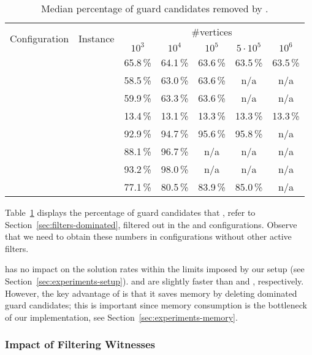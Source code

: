\begin{table}
	\centering
	\small
	\begin{tabular}{|l|l|ccccc|}
		\hline
		\multirow{2}{*}{Configuration} & \multirow{2}{*}{Instance} & \multicolumn{5}{|c|}{\#vertices} \\
		& & $10^3$ & $10^4$ & $10^5$ & $5 \cdot 10^5$ & $10^6$ \\
		\hline
		\hline
		\multirow{4}{*}{\vdefault}
			& \walk           & 65.8\,\% & 64.1\,\% & 63.6\,\% & 63.5\,\% & 63.5\,\% \\
			& \sinewalk       & 58.5\,\% & 63.0\,\% & 63.6\,\% &      n/a &      n/a \\
			& \parabolawalk   & 59.9\,\% & 63.3\,\% & 63.6\,\% &      n/a &      n/a \\
			& \concavevalleys & 13.4\,\% & 13.1\,\% & 13.3\,\% & 13.3\,\% & 13.3\,\% \\
		\hline
		\hline
		\multirow{4}{*}{\pnoedge}
			& \walk           & 92.9\,\% & 94.7\,\% & 95.6\,\% & 95.8\,\% &      n/a \\
			& \sinewalk       & 88.1\,\% & 96.7\,\% &      n/a &      n/a &      n/a \\
			& \parabolawalk   & 93.2\,\% & 98.0\,\% &      n/a &      n/a &      n/a \\
			& \concavevalleys & 77.1\,\% & 80.5\,\% & 83.9\,\% & 85.0\,\% &      n/a \\
		\hline
	\end{tabular}
	\caption{Median percentage of guard candidates removed by \domfilter.}
	\label{tab:domfilter}
\end{table}

Table~\ref{tab:domfilter} displays the percentage of guard candidates that \domfilter, refer to Section~\ref{sec:filters-dominated}, filtered out in the \vdefault and \pnoedge configurations.
Observe that we need to obtain these numbers in configurations without other active filters.

\domfilter has no impact on the solution rates within the limits imposed by our setup (see Section~\ref{sec:experiments-setup}).
\vdefault and \pdefault are slightly faster than \vnodom and \pnodom, respectively.
However, the key advantage of \domfilter is that it saves memory by deleting dominated guard candidates;
this is important since memory consumption is the bottleneck of our implementation, see Section~\ref{sec:experiments-memory}.

\subsubsection{Impact of Filtering Witnesses}
\label{sec:experiments-witnesses}

